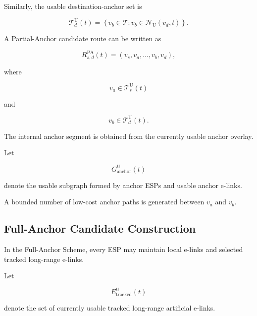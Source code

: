 Similarly, the usable destination-anchor set is

\begin{equation}
    \mathcal{T}_{d}^{\mathrm{U}}(t)
    =
    \left\{
    v_b
    \in
    \mathcal{T}
    :
    v_b
    \in
    \mathcal{N}_{\mathrm{U}}(v_d,t)
    \right\}.
\end{equation}

A Partial-Anchor candidate route can be written as

\begin{equation}
    R_{s,d}^{\mathrm{PA}}(t)
    =
    \left(
    v_s,
    v_a,
    \ldots,
    v_b,
    v_d
    \right),
\end{equation}

where

\begin{equation}
    v_a
    \in
    \mathcal{T}_{s}^{\mathrm{U}}(t)
\end{equation}

and

\begin{equation}
    v_b
    \in
    \mathcal{T}_{d}^{\mathrm{U}}(t).
\end{equation}

The internal anchor segment is obtained from the currently usable anchor overlay.

Let

\begin{equation}
    G_{\mathrm{anchor}}^{\mathrm{U}}(t)
\end{equation}

denote the usable subgraph formed by anchor ESPs and usable anchor e-links.

A bounded number of low-cost anchor paths is generated between $v_a$ and $v_b$.

\subsection{Full-Anchor Candidate Construction}

In the Full-Anchor Scheme, every ESP may maintain local e-links and selected tracked long-range e-links.

Let

\begin{equation}
    E_{\mathrm{tracked}}^{\mathrm{U}}(t)
\end{equation}

denote the set of currently usable tracked long-range artificial e-links.

